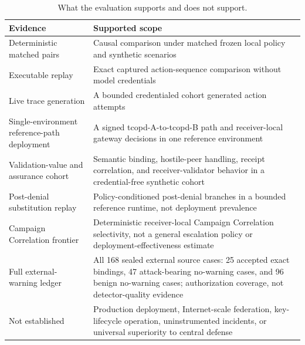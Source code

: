 \begin{table}[t]\centering\small
\caption{What the evaluation supports and does not support.}
\begin{tabular}{p{}p{}}\toprule
Evidence & Supported scope \\ \midrule
Deterministic matched pairs & Causal comparison under matched frozen local policy and synthetic scenarios \\
Executable replay & Exact captured action-sequence comparison without model credentials \\
Live trace generation & A bounded credentialed cohort generated action attempts \\
Single-environment reference-path deployment & A signed tcopd-A-to-tcopd-B path and receiver-local gateway decisions in one reference environment \\
Validation-value and assurance cohort & Semantic binding, hostile-peer handling, receipt correlation, and receiver-validator behavior in a credential-free synthetic cohort \\
Post-denial substitution replay & Policy-conditioned post-denial branches in a bounded reference runtime, not deployment prevalence \\
Campaign Correlation frontier & Deterministic receiver-local Campaign Correlation selectivity, not a general escalation policy or deployment-effectiveness estimate \\
Full external-warning ledger & All 168 sealed external source cases: 25 accepted exact bindings, 47 attack-bearing no-warning cases, and 96 benign no-warning cases; authorization coverage, not detector-quality evidence \\
Not established & Production deployment, Internet-scale federation, key-lifecycle operation, uninstrumented incidents, or universal superiority to central defense \\ \bottomrule
\end{tabular}\label{tab:limitations}\end{table}
